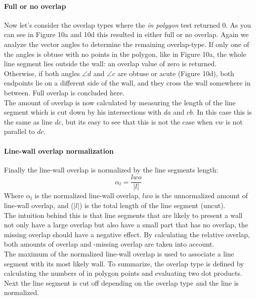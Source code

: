 	\paragraph{Full or no overlap}
	Now let's consider the overlap types where the \emph{in polygon} test
	returned 0.
	As you can see in Figure 10a and 10d this resulted in either full or no overlap.
	Again we analyze the vector angles to determine the remaining overlap-type.
	If only one of the angles is obtuse with no points in the polygon, like in Figure 10a,
	the whole line segment lies outside the wall: an overlap value of zero
	is returned.\\
	Otherwise, if both angles $\angle d$ and $\angle c$ are obtuse or acute (Figure 10d),
	both endpoints lie on a different side of the wall, and they cross the wall somewhere in
	between. Full overlap is concluded here. \\
	The amount of overlap is now calculated by measuring the length
	of the line segment which is cut down by his intersections with $da$ and
	$cb$. In this case this is the same as line $dc$, but its easy to see that
	this is not the case when $vw$ is not parallel to $dc$.\\
	
	\paragraph{Line-wall overlap normalization}
	Finally the line-wall overlap is normalized by the line segments length:\\
	\begin{equation}
		\alpha_l = \frac{lwo}{|l|}
	\end{equation}
	Where $\alpha_l$ is the normalized line-wall overlap, $lwo$ is the unnormalized
	amount of line-wall overlap, and ($|l|$) is the total length of the line
	segment (uncut).\\
	The intuition behind this is that line segments that are likely to
	present a wall not only have a large overlap but also have a small part
	that has no overlap, the missing overlap should have a negative effect. By
	calculating the relative overlap, both amounts of overlap and -missing
	overlap are taken into account.\\
	The maximum of the normalized line-wall overlap is used to associate a
	line segment with its most likely wall.
	To summarize, the overlap type is defined by calculating the numbers of in
	polygon points and evaluating two dot products. Next the line segment is cut off
	depending on the overlap type and the line is normalized. \\
	
